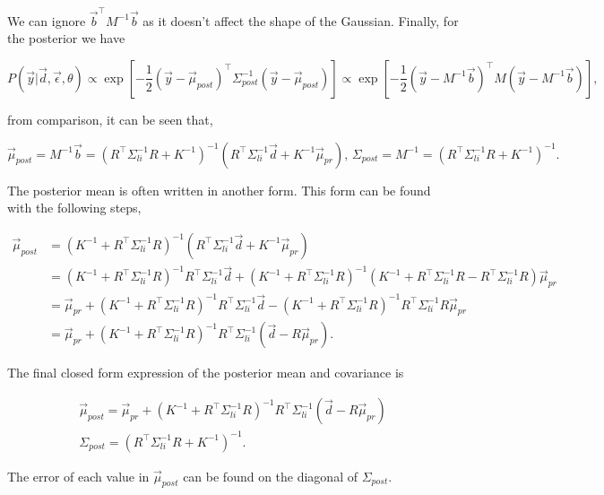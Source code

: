 \noindent We can ignore $\vec b^\top M^{-1} \vec b$ as it doesn't affect the shape of the Gaussian. Finally, for the posterior we have

$$
P(\vec{y}|\vec{d},\vec\epsilon, \theta) \propto \exp \left[ -\frac{1}{2}(\vec y - \vec{\mu}_{post})^{\top} \Sigma^{-1}_{post} (\vec y - \vec{\mu}_{post}) \right] \propto \exp \left[ -\frac{1}{2} (\vec y - M^{-1}\vec b)^\top M (\vec y - M^{-1} \vec b)\right],
$$

\noindent from comparison, it can be seen that,

\begin{equation}
\vec{\mu}_{post} = M^{-1} \vec b = \left(R^\top \Sigma_{li}^{-1} R + K^{-1}\right)^{-1} \left(R^{\top} \Sigma_{li}^{-1}\vec d + K^{-1} \vec \mu_{pr}\right), \, \Sigma_{post} = M^{-1} = \left(R^\top \Sigma_{li}^{-1} R + K^{-1}\right)^{-1}.
\end{equation}

\noindent The posterior mean is often written in another form. This form can be found with the following steps,

$$
\begin{aligned}
\vec{\mu}_{post} &= (K^{-1} + R^{\top} \Sigma_{li}^{-1} R)^{-1}(R^{\top} \Sigma_{li}^{-1} \vec{d} + K^{-1} \vec{\mu}_{pr}) \\
&= (K^{-1} + R^{\top} \Sigma_{li}^{-1} R)^{-1} R^{\top} \Sigma_{li}^{-1} \vec{d} + (K^{-1} + R^{\top} \Sigma_{li}^{-1} R)^{-1} (K^{-1} + R^{\top} \Sigma_{li}^{-1} R - R^{\top} \Sigma_{li}^{-1} R) \vec{\mu}_{pr} \\
&= \vec{\mu}_{pr} + (K^{-1} + R^{\top} \Sigma_{li}^{-1} R)^{-1} R^{\top} \Sigma_{li}^{-1} \vec{d} - (K^{-1} + R^{\top} \Sigma_{li}^{-1} R)^{-1} R^{\top} \Sigma_{li}^{-1} R \vec{\mu}_{pr} \\
&= \vec{\mu}_{pr} + (K^{-1} + R^{\top} \Sigma_{li}^{-1} R)^{-1} R^{\top} \Sigma_{li}^{-1} (\vec{d} - R \vec{\mu}_{pr}).
\end{aligned}
$$

\noindent The final closed form expression of the posterior mean and covariance is

\begin{gather}
\vec{\mu}_{post}= \vec{\mu}_{pr} + (K^{-1} + R^{\top} \Sigma_{li}^{-1} R)^{-1} R^{\top} \Sigma_{li}^{-1} (\vec{d} - R \vec{\mu}_{pr})\\
\Sigma_{post} = \left(R^\top \Sigma_{li}^{-1} R + K^{-1}\right)^{-1}.
\end{gather}

\noindent The error of each value in $\vec{\mu}_{post}$ can be found on the diagonal of $\Sigma_{post}$.
